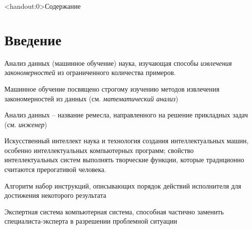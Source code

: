 \documentclass[pdf, intlimits, 9pt, unicode]{beamer}
\title[\disciplineshortname]{\docname}
\begin{document}
\maketitle

\begin{frame}<handout:0>{Содержание}\tableofcontents[pausesections]\end{frame}

\section{Введение}



\begin{frame}
	\begin{block}{Анализ данных (машинное обучение)}
	наука, изучающая способы \emph{извлечения закономерностей} из ограниченного количества примеров.
	\end{block}\pause
	\medskip
	
	Машинное обучение посвящено строгому изучению методов извлечения закономерностей из данных (см. {\color{red}\emph{математический анализ}})\pause
	
	Анализ данных -- название ремесла, направленного на решение прикладных задач (см. {\color{red}\emph{инженер}})

\end{frame}





\begin{frame}

	\begin{block}{Искусственный интеллект}
наука и технология создания интеллектуальных машин, особенно интеллектуальных компьютерных программ; свойство интеллектуальных систем выполнять творческие функции, которые традиционно считаются прерогативой человека.
	\end{block}\pause
	\medskip


	\begin{block}{Алгоритм}
	набор инструкций, описывающих порядок действий исполнителя для достижения некоторого результата
	\end{block}\pause
	\medskip


	\begin{block}{Экспертная система}
	компьютерная система, способная частично заменить специалиста-эксперта в разрешении проблемной ситуации
	\end{block}\pause
	\medskip


\end{frame}
\end{document}

